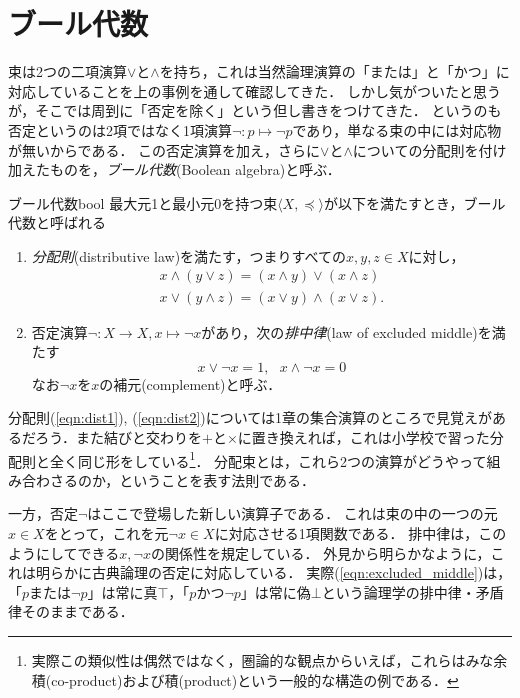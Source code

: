 \documentclass[11pt,a4paper, dvipdfmx]{jsarticle}
\begin{document}


\section{ブール代数}

束は2つの二項演算$\vee$と$\wedge$を持ち，これは当然論理演算の「または」と「かつ」に対応していることを上の事例を通して確認してきた．
しかし気がついたと思うが，そこでは周到に「否定を除く」という但し書きをつけてきた．
というのも否定というのは2項ではなく1項演算$\neg:p \mapsto \neg p$であり，単なる束の中には対応物が無いからである．
この否定演算を加え，さらに$\vee$と$\wedge$についての分配則を付け加えたものを，\emph{ブール代数}(Boolean algebra)と呼ぶ．

\begin{dfn}{ブール代数}{bool}
    最大元1と最小元0を持つ束$\langle X, \preceq \rangle$が以下を満たすとき，ブール代数と呼ばれる
    \begin{enumerate}
        \item \emph{分配則}(distributive law)を満たす，つまりすべての$x, y, z \in X$に対し，
        \begin{align}
         x \wedge (y \vee z) = (x \wedge y) \vee (x \wedge z) \label{eqn:dist1}\\
         x \vee (y \wedge z) = (x \vee y) \wedge (x \vee z) . \label{eqn:dist2}
        \end{align}
        \item 否定演算$\neg: X \to X, x \mapsto \neg x$があり，次の\emph{排中律}(law of excluded middle)を満たす
        \begin{equation}
            x \vee \neg x = 1, \ \ \ x \wedge \neg x = 0
           \label{eqn:excluded_middle}
        \end{equation}
        なお$\neg x$を$x$の補元(complement)と呼ぶ．
    \end{enumerate}   
\end{dfn}

分配則(\ref{eqn:dist1}), (\ref{eqn:dist2})については1章の集合演算のところで見覚えがあるだろう．また結びと交わりを$+$と$\times$に置き換えれば，これは小学校で習った分配則と全く同じ形をしている\footnote{実際この類似性は偶然ではなく，圏論的な観点からいえば，これらはみな余積(co-product)および積(product)という一般的な構造の例である．}．
分配束とは，これら2つの演算がどうやって組み合わさるのか，ということを表す法則である．

一方，否定$\neg$はここで登場した新しい演算子である．
これは束の中の一つの元$x \in X$をとって，これを元$\neg x \in X$に対応させる1項関数である．
排中律は，このようにしてできる$x, \neg x$の関係性を規定している．
外見から明らかなように，これは明らかに古典論理の否定に対応している．
実際(\ref{eqn:excluded_middle})は，「$p$または$\neg p$」は常に真$\top$，「$p$かつ$\neg p$」は常に偽$\bot$という論理学の排中律・矛盾律そのままである．
\end{document}
